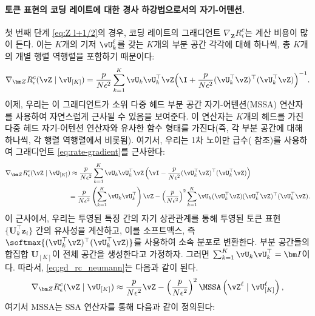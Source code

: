 \documentclass[../../book-main_ko.tex]{subfiles}
\begin{document}
\paragraph{토큰 표현의 코딩 레이트에 대한 경사 하강법으로서의 자기-어텐션.} 첫 번째 단계 \eqref{eq:Z l+1/2}의 경우, 코딩 레이트의 그래디언트 \(\nabla_{\bm Z} R^c_\epsilon\)는 계산 비용이 많이 든다. 이는 \(K\)개의 기저 \(\vU_{k}^{\ell}\)를 갖는 \(K\)개의 부분 공간 각각에 대해 하나씩, 총 \(K\)개의 개별 행렬 역행렬을 포함하기 때문이다:
\begin{equation}
    \nabla_{\bm Z} R_{\epsilon}^c(\vZ \mid \vU_{[K]})
    = \frac{p}{N\epsilon^2}\sum_{k=1}^K \vU_k\vU_k^\top\vZ\Big(\I +
    \frac{p}{N\epsilon^2}(\vU_k^\top\vZ)^\top(\vU_k^\top\vZ)\Big)^{-1}.
    \label{eq:rate-gradient}
\end{equation}
이제, 우리는 이 그래디언트가 소위 다중 헤드 부분 공간 자기-어텐션(MSSA) 연산자를 사용하여 자연스럽게 근사될 수 있음을 보여준다. 이 연산자는 \(K\)개의 헤드를 가진 다중 헤드 자기-어텐션 연산자\citep{vaswani2017attention}와 유사한 함수 형태를 가진다(즉, 각 부분 공간에 대해 하나씩, 각 행렬 역행렬에서 비롯됨). 여기서, 우리는 1차 노이만 급수( 참조)를 사용하여 그래디언트 \eqref{eq:rate-gradient}를 근사한다:
\begin{align}\label{eq:gd_rc_neumann}
    \nabla_{\bm Z} R_{\epsilon}^{c}(\vZ \mid \vU_{[K]}) 
    &\approx \frac{p}{N\epsilon^2} \sum_{k = 1}^{K}\vU_{k}\vU_{k}^\top\vZ\left(\vI - \frac{p}{N\epsilon^2} (\vU_{k}^\top\vZ)^\top(\vU_{k}^\top\vZ)\right) \notag \\
    &{= \frac{p}{N\epsilon^2} \left(\sum_{k = 1}^{K} \vU_{k}\vU_{k}^\top\right)\vZ -  \left( \frac{p}{N\epsilon^2}\right)^2\sum_{k = 1}^{K} \vU_{k}(\vU_{k}^\top\vZ)(\vU_{k}^\top\vZ)^\top(\vU_{k}^\top\vZ)}.
\end{align}
이 근사에서, 우리는 투영된 특징 간의 자기 상관관계를 통해 투영된 토큰 표현 $\{\bm U_k^\top\bm z_i\}$ 간의 유사성을 계산하고, 이를 소프트맥스, 즉 $\softmax{(\vU_{k}^\top\vZ)^\top(\vU_{k}^\top\vZ)}$를 사용하여 소속 분포로 변환한다.
부분 공간들의 합집합 $\bm U_{[K]}$이 전체 공간을 생성한다고 가정하자. 그러면 $\sum_{k = 1}^{K} \vU_{k}\vU_{k}^\top = \bm I$이다. 따라서, \eqref{eq:gd_rc_neumann}는 다음과 같이 된다.
\begin{align}\label{eq:grad Rc}
    \nabla_{\bm Z} R_{\epsilon}^{c}(\vZ \mid \vU_{[K]}) 
     \approx  \frac{p}{N\epsilon^2} \vZ -  \left( \frac{p}{N\epsilon^2}\right)^2 \MSSA\left(\vZ^{\ell} \mid \vU_{[K]}^{\ell}\right),
\end{align}
여기서 MSSA는 SSA 연산자를 통해 다음과 같이 정의된다:
\end{document}

